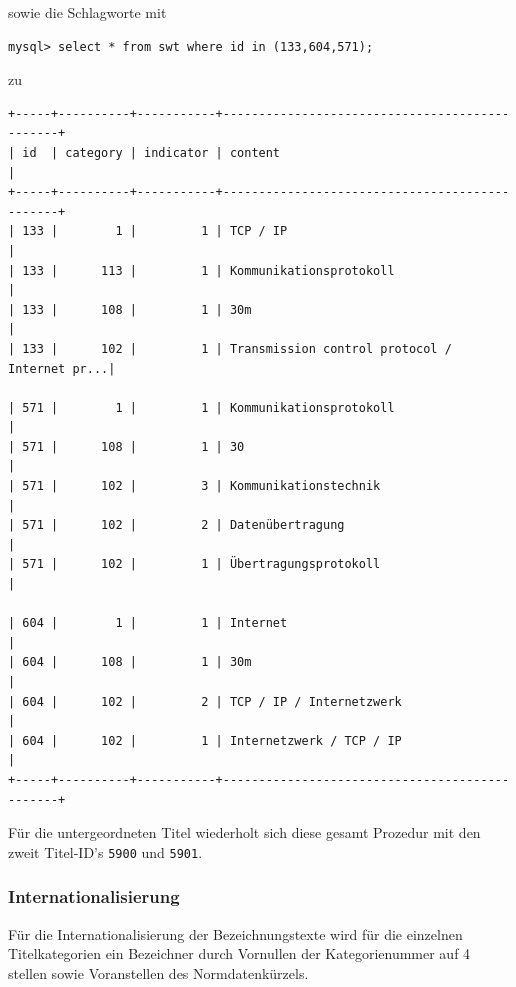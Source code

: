 \documentclass[11pt, twoside, a4paper, BCOR8mm, DIV12, bibtotoc,idxtotoc]{scrbook}
\begin{document}
sowie die Schlagworte mit 

\begin{verbatim}
mysql> select * from swt where id in (133,604,571);
\end{verbatim}
zu

\begin{shadowenv}
\begin{center}
\begin{verbatim}
+-----+----------+-----------+-----------------------------------------------+
| id  | category | indicator | content                                       |
+-----+----------+-----------+-----------------------------------------------+
| 133 |        1 |         1 | TCP / IP                                      |
| 133 |      113 |         1 | Kommunikationsprotokoll                       |
| 133 |      108 |         1 | 30m                                           |
| 133 |      102 |         1 | Transmission control protocol / Internet pr...|

| 571 |        1 |         1 | Kommunikationsprotokoll                       |
| 571 |      108 |         1 | 30                                            |
| 571 |      102 |         3 | Kommunikationstechnik                         |
| 571 |      102 |         2 | Datenübertragung                              |
| 571 |      102 |         1 | Übertragungsprotokoll                         |

| 604 |        1 |         1 | Internet                                      |
| 604 |      108 |         1 | 30m                                           |
| 604 |      102 |         2 | TCP / IP / Internetzwerk                      |
| 604 |      102 |         1 | Internetzwerk / TCP / IP                      |
+-----+----------+-----------+-----------------------------------------------+
\end{verbatim}
\end{center}
\end{shadowenv}

Für die untergeordneten Titel wiederholt sich diese gesamt Prozedur
mit den zweit Titel-ID's \texttt{5900} und \texttt{5901}.

\subsubsection{Internationalisierung}

Für die Internationalisierung der Bezeichnungstexte wird für die
einzelnen Titelkategorien ein Bezeichner durch Vornullen der
Kategorienummer auf 4 stellen sowie Voranstellen des Normdatenkürzels.
\end{document}
